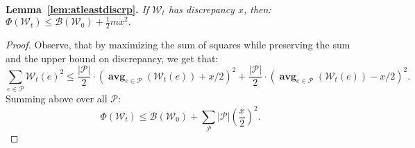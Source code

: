 \documentclass{article}[11pt,letter]
\newcommand{\wload}{\mathcal{W}}
\DeclareMathOperator*{\avg}{\mathbf{avg}}
\begin{document}
\noindent\textbf{Lemma~\ref{lem:atleastdiscrp}.}
\emph{If $\wload_t$ has discrepancy $x$, then:
$\Phi(\wload_t) \le \mathcal{B}(\wload_0) + \frac12 m x^2.$}

\begin{proof}
Observe, that by maximizing the sum of squares while preserving the sum and the upper bound on discrepancy, we get that:
$$\sum_{e \in \mathcal{P}} \wload_t(e)^2 \le \frac{|\mathcal{P}|}{2} \cdot (\avg_{e \in \mathcal{P}}(\wload_t(e))+x/2)^2+\frac{|\mathcal{P}|}{2} \cdot (\avg_{e \in \mathcal{P}}(\wload_t(e)) - x/2)^2.$$
Summing above over all $\mathcal{P}$:
$$\Phi(\wload_t) \le \mathcal{B}(\wload_0) + \sum_{\mathcal{P}} |\mathcal{P}|\left(\frac{x}{2}\right)^2.$$

\end{proof}
\end{document}
